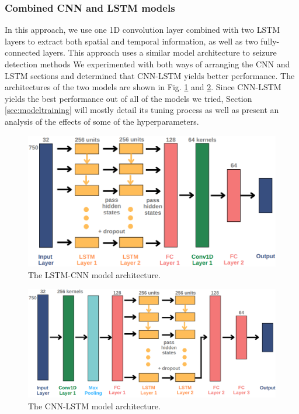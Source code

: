 \documentclass[format=sigconf, nonacm=true, review=true, screen=true]{acmart}
\begin{document}
\subsubsection{Combined CNN and LSTM models}
In this approach, we use one 1D convolution layer combined with two LSTM layers to extract both spatial and temporal information, as well as two fully-connected layers. This approach uses a similar model architecture to seizure detection methods \cite{xu2020seizure}
We experimented with both ways of arranging the CNN and LSTM sections and determined that CNN-LSTM yields better performance. The architectures of the two models are shown in Fig. \ref{fig:lstm-cnn-arch} and \ref{fig:cnn-lstm-arch}. Since CNN-LSTM yields the best performance out of all of the models we tried, Section \ref{sec:modeltraining} will mostly detail its tuning process as well as present an analysis of the effects of some of the hyperparameters.

\begin{figure}[H]
    \centering
    \includegraphics[width=\columnwidth]{figures/lstm-cnn-arch.png}
    \caption{The LSTM-CNN model architecture.}
    \label{fig:lstm-cnn-arch}
\end{figure}

\begin{figure}[H]
    \centering
    \includegraphics[width=\columnwidth]{figures/cnn-lstm-arch.png}
    \caption{The CNN-LSTM model architecture.}
    \label{fig:cnn-lstm-arch}
\end{figure}
\end{document}
